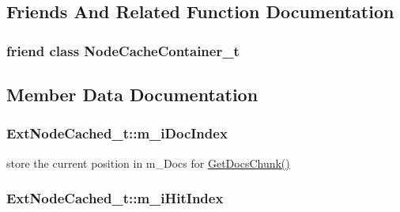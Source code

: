 \subsection{Friends And Related Function Documentation}
\hypertarget{classExtNodeCached__t_ad23beeca56c9f2e242551a4306c1f8ab}{
\subsubsection[{Node\-Cache\-Container\-\_\-t}]{\setlength{\rightskip}{0pt plus 5cm}friend class {\bf Node\-Cache\-Container\-\_\-t}\hspace{0.3cm}{\ttfamily [friend]}}}\label{classExtNodeCached__t_ad23beeca56c9f2e242551a4306c1f8ab}


\subsection{Member Data Documentation}
\hypertarget{classExtNodeCached__t_ac5fb49a1b0412d2368169b2908e72abe}{
\subsubsection[{m\-\_\-i\-Doc\-Index}]{ Ext\-Node\-Cached\-\_\-t\-::m\-\_\-i\-Doc\-Index\hspace{0.3cm}{\ttfamily [private]}}}\label{classExtNodeCached__t_ac5fb49a1b0412d2368169b2908e72abe}


store the current position in m\-\_\-\-Docs for \hyperlink{classExtNodeCached__t_a3f16526caad3bd9e4a846db9007ea950}{Get\-Docs\-Chunk()} 

\hypertarget{classExtNodeCached__t_a668473b25ec6f1df2163bd4a6f18da9e}{
\subsubsection[{m\-\_\-i\-Hit\-Index}]{ Ext\-Node\-Cached\-\_\-t\-::m\-\_\-i\-Hit\-Index\hspace{0.3cm}{\ttfamily [private]}}}\label{classExtNodeCached__t_a668473b25ec6f1df2163bd4a6f18da9e}


